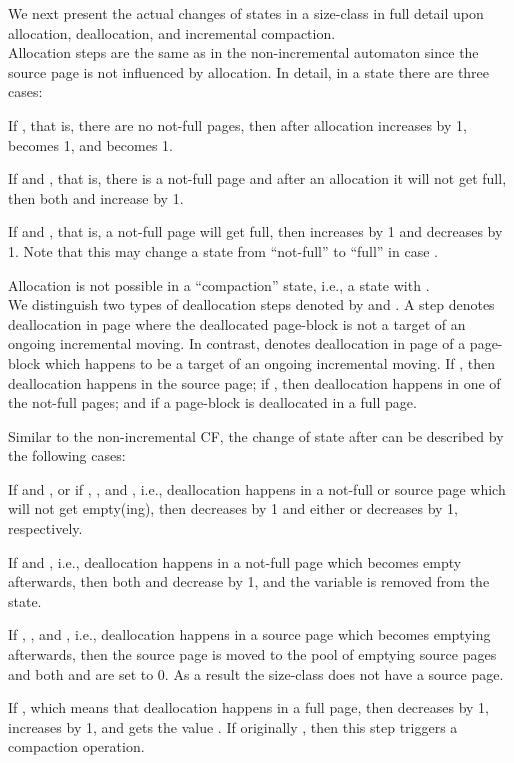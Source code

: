 \documentclass{amsart}
\begin{document}
We next present the actual changes of states in a size-class in full
detail upon allocation, deallocation, and incremental compaction.\\

Allocation steps are the same as in the non-incremental automaton
since the source page is not influenced by allocation.  In detail, in
a state  there are three cases:
\begin{list}{}{\leftmargin=1.2em}
\item[1.] If , that is, there are no not-full pages, then after allocation  increases by 1,
 becomes 1, and  becomes 1.
\item[2.] If  and , that is, there is a not-full page and after an allocation it will not get full,
then both   and  increase by 1.
\item[3.] If  and , that is, a not-full page will get full, then  increases by 1 and  decreases
by 1. Note that this may change a state from ``not-full'' to ``full'' in case .
\end{list}
Allocation is not possible in a ``compaction'' state, i.e., a state with .\\

We distinguish two types of deallocation steps denoted by  and
. A step  denotes deallocation in page  where the
deallocated page-block is not a target of an ongoing incremental
moving. In contrast,  denotes deallocation in page  of a
page-block which happens to be a target of an ongoing incremental
moving. If , then deallocation happens in the source page;
if , then deallocation happens in one of the not-full
pages; and if  a page-block is deallocated in a full page.

Similar to the non-incremental CF, the change of state after  can
be described by the following cases:
\begin{list}{}{\leftmargin=1.2em}
\item[1.] If  and , or if , , and ,
i.e., deallocation happens in a not-full or source page which will not get empty(ing), then  decreases
by 1 and either  or  decreases by 1, respectively.
\item[2.] If  and , i.e., deallocation happens
in a not-full page which becomes empty afterwards, then both  and  decrease by 1, and the variable 
is removed from the
state.
\item[3.] If , , and , i.e., deallocation happens in a
source page which becomes emptying afterwards, then the source page is moved to the pool of emptying source pages  and
both  and  are set to 0. As a result the size-class
does not have a source page.
\item[4.] If , which means that deallocation happens in a full page, then  decreases by 1,  increases by 1,
 and 
gets the value . If originally , then this step triggers a compaction operation.
\end{list}
\end{document}
